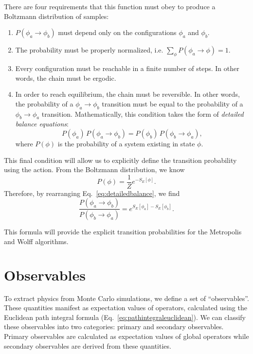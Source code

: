 There are four requirements that this function must obey to produce a Boltzmann distribution of samples:
\begin{enumerate}
    \item $P(\phi_a \rightarrow \phi_b)$ must depend only on the configurations $\phi_a$ and $\phi_b$.
    \item The probability must be properly normalized, i.e. $\sum_{\phi} P(\phi_a \rightarrow \phi) = 1$.
    \item Every configuration must be reachable in a finite number of steps. In other words, the chain must be ergodic.
    \item In order to reach equilibrium, the chain must be reversible. In other words, the probability of a $\phi_a\rightarrow\phi_b$ transition must be equal to the probability of a $\phi_b\rightarrow\phi_a$ transition. Mathematically, this condition takes the form of \textit{detailed balance equations}:
\begin{equation}
    \label{eq:detailedbalance}
    P(\phi_a)\,P(\phi_a\rightarrow\phi_b) = P(\phi_b)\,P(\phi_b\rightarrow\phi_a),
\end{equation}
where $P(\phi)$ is the probability of a system existing in state $\phi$.
\end{enumerate}

This final condition will allow us to explicitly define the transition probability using the action. From the Boltzmann distribution, we know
\begin{equation}
    P(\phi) = \frac{1}{Z} e^{-S_E[\phi]}.
\end{equation}
Therefore, by rearranging Eq.~\ref{eq:detailedbalance}, we find
\begin{equation}
    \label{eq:detailedbalance2}
    \frac{P(\phi_a\rightarrow\phi_b)}{P(\phi_b\rightarrow\phi_a)} = e^{S_E[\phi_a] - S_E[\phi_b]}.
\end{equation}

This formula will provide the explicit transition probabilities for the Metropolis and Wolff algorithms.




\section{Observables}

To extract physics from Monte Carlo simulations, we define a set of ``observables''. These quantities manifest as expectation values of operators, calculated using the Euclidean path integral formula (Eq.~\ref{eq:pathintegraleuclidean}). We can classify these observables into two categories: primary and secondary observables. Primary observables are calculated as expectation values of global operators while secondary observables are derived from these quantities.

